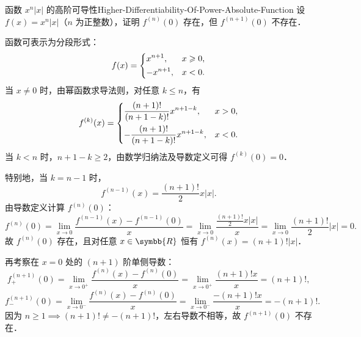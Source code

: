 \begin{problem}{函数 $x^n|x|$ 的高阶可导性}{Higher-Differentiability-Of-Power-Absolute-Function}
    设 $f(x) = x^n |x|$（$n$ 为正整数），证明 $f^{(n)}(0)$ 存在，但 $f^{(n+1)}(0)$ 不存在．
\end{problem}

\begin{myproof}
    函数可表示为分段形式：
    \begin{equation}
        f(x) = \begin{dcases} x^{n+1}, & x \geqslant 0, \\ -x^{n+1}, & x < 0. \end{dcases}
    \end{equation}
    当 $x \neq 0$ 时，由幂函数求导法则，对任意 $k \leqslant n$，有
    \begin{equation}
        f^{(k)}(x) = \begin{dcases} \frac{(n+1)!}{(n+1-k)!} x^{n+1-k}, & x > 0, \\ -\frac{(n+1)!}{(n+1-k)!} x^{n+1-k}, & x < 0. \end{dcases}
    \end{equation}
    当 $k < n$ 时，$n + 1 - k \geqslant 2$，由数学归纳法及导数定义可得 $f^{(k)}(0) = 0$．

    特别地，当 $k = n - 1$ 时，
    \begin{equation}
        f^{(n-1)}(x) = \frac{(n+1)!}{2} x |x|.
    \end{equation}
    由导数定义计算 $f^{(n)}(0)$：
    \begin{equation}
        f^{(n)}(0) = \lim_{x\to 0} \frac{f^{(n-1)}(x) - f^{(n-1)}(0)}{x} = \lim_{x\to 0} \frac{\frac{(n+1)!}{2} x |x|}{x} = \lim_{x\to 0} \frac{(n+1)!}{2} |x| = 0.
    \end{equation}
    故 $f^{(n)}(0)$ 存在，且对任意 $x \in \symbb{R}$ 恒有 $f^{(n)}(x) = (n+1)! |x|$．

    再考察在 $x = 0$ 处的 $(n+1)$ 阶单侧导数：
    \begin{equation}
        f^{(n+1)}_+(0) = \lim_{x\to 0^+} \frac{f^{(n)}(x) - f^{(n)}(0)}{x} = \lim_{x\to 0^+} \frac{(n+1)! x}{x} = (n+1)!,
    \end{equation}
    \begin{equation}
        f^{(n+1)}_-(0) = \lim_{x\to 0^-} \frac{f^{(n)}(x) - f^{(n)}(0)}{x} = \lim_{x\to 0^-} \frac{-(n+1)! x}{x} = -(n+1)!.
    \end{equation}
    因为 $n \geqslant 1 \implies (n+1)! \neq -(n+1)!$，左右导数不相等，故 $f^{(n+1)}(0)$ 不存在．
\end{myproof}

